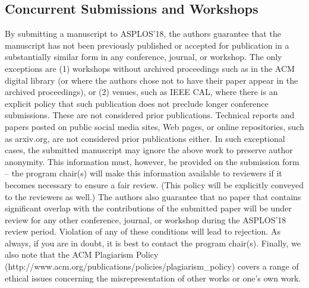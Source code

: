 \documentclass[pageno]{jpaper}
\begin{document}
\subsection{Concurrent Submissions and Workshops}

By submitting a manuscript to ASPLOS'18, the authors guarantee that the
manuscript has not been previously published or accepted for publication in
a substantially similar form in any conference, journal, or workshop. The
only exceptions are (1) workshops without archived proceedings such as in
the ACM digital library (or where the authors chose not to have their paper
appear in the archived proceedings), or (2) venues, such as IEEE CAL, where
there is an explicit policy that such publication does not preclude longer
conference submissions. These are not considered prior publications. 
Technical reports and papers posted on public social media sites, Web pages,
or online repositories, such as arxiv.org, are not considered prior
publications either. In such exceptional cases, the submitted manuscript may
ignore the above work to preserve author anonymity. This information must,
however, be provided on the submission form -- the program chair(s) will
make this information available to reviewers if it becomes necessary to
ensure a fair review. (This policy will be explicitly conveyed to the
reviewers as well.)  The authors also guarantee that no paper that contains
significant overlap with the contributions of the submitted paper will be
under review for any other conference, journal, or workshop during the
ASPLOS'18 review period. Violation of any of these conditions will lead to
rejection.  As always, if you are in doubt, it is best to contact the
program chair(s).  Finally, we also note that the ACM Plagiarism Policy
(http://www.acm.org/publications/policies/plagiarism\_policy) covers a range
of ethical issues concerning the misrepresentation of other works or one's
own work.
\end{document}
